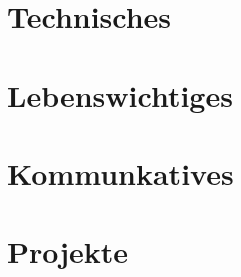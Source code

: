 \documentclass[oneside,12pt,a4paper]{scrartcl}
\author{\irc}
\title{\about}
\begin{document}
\maketitle
\tableofcontents
\clearpage

\newpage
\part{Technisches}


\newpage
\part{Lebenswichtiges}


\newpage
\part{Kommunkatives}


\newpage
\part{Projekte}

\end{document}
